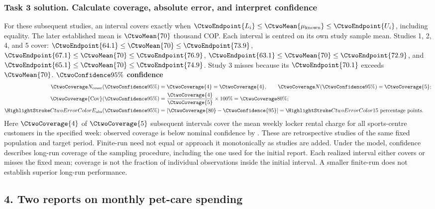 \subsubsection*{Task 3 solution. Calculate coverage, absolute error, and interpret confidence}
For these subsequent studies, an interval covers exactly when $\CtwoEndpoint{L_i}\leq\CtwoMean{\mu_{\mathrm{known}}}\leq\CtwoEndpoint{U_i}$, including equality. The later established mean is $\CtwoMean{70}$ thousand COP. Each interval is centred on its own study sample mean.
Studies 1, 2, 4, and 5 cover: $\CtwoEndpoint{64.1}\leq\CtwoMean{70}\leq\CtwoEndpoint{73.9}$, $\CtwoEndpoint{67.1}\leq\CtwoMean{70}\leq\CtwoEndpoint{76.9}$, $\CtwoEndpoint{63.1}\leq\CtwoMean{70}\leq\CtwoEndpoint{72.9}$, and $\CtwoEndpoint{65.1}\leq\CtwoMean{70}\leq\CtwoEndpoint{74.9}$. Study 3 misses because its  $\CtwoEndpoint{70.1}$ exceeds $\CtwoMean{70}$.
\textbf{$\CtwoConfidence{95\%}$ confidence}
\begin{align*}
\CtwoCoverCount(\CtwoConfidence{95\%})&=\CtwoCoverage{4}=\CtwoCoverage{4},\qquad \CtwoTotalCount(\CtwoConfidence{95\%})=\CtwoCoverage{5};\\
\CtwoCoverage{\mathrm{Cov}}(\CtwoConfidence{95\%})&=\frac{\CtwoCoverage{4}}{\CtwoCoverage{5}}\times100\%=\CtwoCoverage{80\%};\\
\CtwoError{E_{\rm abs}}(\CtwoConfidence{95\%})&=\left|\CtwoCoverage{80}-\CtwoConfidence{95}\right|=\CtwoError{15}\ \text{percentage points}.
\end{align*}
Here $\CtwoCoverage{4}$ of $\CtwoCoverage{5}$ subsequent intervals cover the mean weekly locker rental charge for all sports-centre customers in the specified week: observed coverage is below nominal  confidence by  .
These are retrospective studies of the same fixed population and target period. Finite-run  need not equal  or approach it monotonically as studies are added. Under the model, confidence describes long-run coverage of the sampling procedure, including the one used for the initial report. Each realized interval either covers or misses the fixed mean; coverage is not the fraction of individual observations inside the initial interval. A smaller finite-run  does not establish superior long-run performance.
\clearpage
\subsection*{4. Two reports on monthly pet-care spending}
